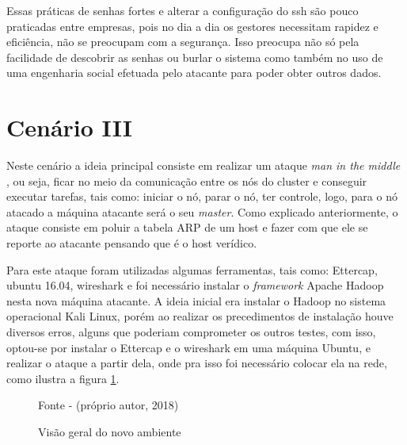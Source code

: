 Essas práticas de senhas fortes e alterar a configuração do ssh são pouco praticadas entre empresas, pois no dia a dia os gestores necessitam rapidez e eficiência, não se preocupam com a segurança. Isso preocupa não só pela facilidade de descobrir as senhas ou burlar o sistema como também no uso de uma engenharia social efetuada pelo atacante para poder obter outros dados.

\newpage
\section{Cenário III}
Neste cenário a ideia principal consiste em realizar um ataque \textit{man in the middle} , ou seja, ficar no meio da comunicação entre os nós do cluster e conseguir executar tarefas, tais como: iniciar o nó, parar o nó, ter controle, logo, para o nó atacado a máquina atacante será o seu \textit{master}. Como explicado anteriormente, o ataque consiste em poluir a tabela ARP de um host e fazer com que ele se reporte ao atacante pensando que é o host verídico.

Para este ataque foram utilizadas algumas ferramentas, tais como: Ettercap, ubuntu 16.04, wireshark e foi necessário instalar o \textit{framework} Apache Hadoop nesta nova máquina atacante. A ideia inicial era instalar o Hadoop no sistema operacional Kali Linux, porém ao realizar os precedimentos de instalação houve diversos erros, alguns que poderiam comprometer os outros testes, com isso, optou-se por instalar o Ettercap e o wireshark em uma máquina Ubuntu, e realizar o ataque a partir dela, onde pra isso foi necessário colocar ela na rede, como ilustra a figura \ref{Fig:novoAmbiente}.

\begin{figure}[htbp!] \begin{center}
\caption{Visão geral do novo ambiente}
\small{Fonte - (próprio autor, 2018)}
\label{Fig:novoAmbiente}
\end{center} \end{figure}

